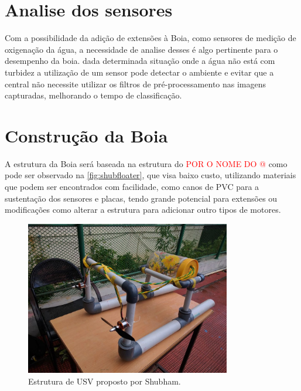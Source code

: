 \section{Analise dos sensores}
Com a possibilidade da adição de extensões à Boia, como sensores de medição de oxigenação da água, a necessidade de analise desses é algo pertinente para o desempenho da boia. dada determinada situação onde a água não está com turbidez a utilização de um sensor pode detectar o ambiente e evitar que a central não necessite utilizar os filtros de pré-processamento nas imagens capturadas, melhorando o tempo de classificação.



\section{Construção da Boia}
A estrutura da Boia será baseada na estrutura do \textcolor{red}{POR O NOME DO @} como pode ser observado na \autoref{fig:shubfloater}, que visa baixo custo, utilizando materiais que podem ser encontrados com facilidade, como canos de PVC para a sustentação dos sensores e placas, tendo grande potencial para extensões ou modificações como alterar a estrutura para adicionar outro tipos de motores.

\begin{figure}[ht]
	\caption{\label{fig:shubfloater}  Estrutura de USV proposto por 
	Shubham.}
	 \begin{center}
		\includegraphics[width = 0.8\textwidth]			{resources/shubhamfloater}
    \end{center}
\end{figure}



